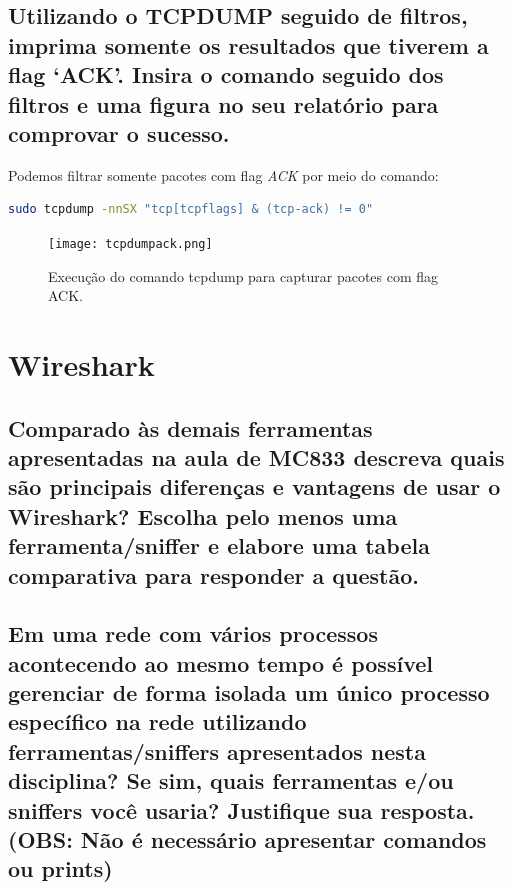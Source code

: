 \documentclass[12pt,a4paper]{report}
\begin{document}
\subsection{Utilizando o TCPDUMP seguido de filtros, imprima somente os resultados que tiverem a flag ‘ACK’. Insira o comando seguido dos filtros e uma figura no seu relatório para comprovar o sucesso.}

Podemos filtrar somente pacotes com flag \emph{ACK} por meio do comando:

\begin{lstlisting}[language=bash]
sudo tcpdump -nnSX "tcp[tcpflags] & (tcp-ack) != 0"
\end{lstlisting}


\begin{figure}
        \texttt{[image: tcpdumpack.png]}
        \caption{Execução do comando tcpdump para capturar pacotes com flag ACK.}
\end{figure}

\section{Wireshark}


\subsection{Comparado às demais ferramentas apresentadas na aula de MC833 descreva quais são principais diferenças e vantagens de usar o Wireshark? Escolha pelo menos uma ferramenta/sniffer e elabore uma tabela comparativa para responder a questão.}

\subsection{Em uma rede com vários processos acontecendo ao mesmo tempo é possível gerenciar de forma isolada um único processo específico na rede utilizando ferramentas/sniffers apresentados nesta disciplina? Se sim, quais ferramentas e/ou sniffers você usaria? Justifique sua resposta. (OBS: Não é necessário apresentar comandos ou prints)}
\end{document}
